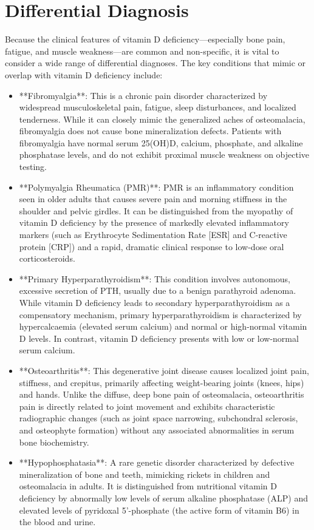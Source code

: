 \section*{Differential Diagnosis}
Because the clinical features of vitamin D deficiency—especially bone pain, fatigue, and muscle weakness—are common and non-specific, it is vital to consider a wide range of differential diagnoses. The key conditions that mimic or overlap with vitamin D deficiency include:
\begin{itemize}
    \item **Fibromyalgia**: This is a chronic pain disorder characterized by widespread musculoskeletal pain, fatigue, sleep disturbances, and localized tenderness. While it can closely mimic the generalized aches of osteomalacia, fibromyalgia does not cause bone mineralization defects. Patients with fibromyalgia have normal serum 25(OH)D, calcium, phosphate, and alkaline phosphatase levels, and do not exhibit proximal muscle weakness on objective testing.
    \item **Polymyalgia Rheumatica (PMR)**: PMR is an inflammatory condition seen in older adults that causes severe pain and morning stiffness in the shoulder and pelvic girdles. It can be distinguished from the myopathy of vitamin D deficiency by the presence of markedly elevated inflammatory markers (such as Erythrocyte Sedimentation Rate [ESR] and C-reactive protein [CRP]) and a rapid, dramatic clinical response to low-dose oral corticosteroids.
    \item **Primary Hyperparathyroidism**: This condition involves autonomous, excessive secretion of PTH, usually due to a benign parathyroid adenoma. While vitamin D deficiency leads to secondary hyperparathyroidism as a compensatory mechanism, primary hyperparathyroidism is characterized by hypercalcaemia (elevated serum calcium) and normal or high-normal vitamin D levels. In contrast, vitamin D deficiency presents with low or low-normal serum calcium.
    \item **Osteoarthritis**: This degenerative joint disease causes localized joint pain, stiffness, and crepitus, primarily affecting weight-bearing joints (knees, hips) and hands. Unlike the diffuse, deep bone pain of osteomalacia, osteoarthritis pain is directly related to joint movement and exhibits characteristic radiographic changes (such as joint space narrowing, subchondral sclerosis, and osteophyte formation) without any associated abnormalities in serum bone biochemistry.
    \item **Hypophosphatasia**: A rare genetic disorder characterized by defective mineralization of bone and teeth, mimicking rickets in children and osteomalacia in adults. It is distinguished from nutritional vitamin D deficiency by abnormally low levels of serum alkaline phosphatase (ALP) and elevated levels of pyridoxal 5'-phosphate (the active form of vitamin B6) in the blood and urine.

\end{itemize}
